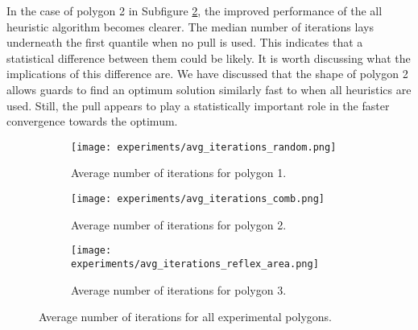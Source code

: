 In the case of polygon 2 in Subfigure \ref{fig:avg_iterations_comb}, the improved performance of the all heuristic algorithm becomes clearer. The median number of iterations lays underneath the first quantile when no pull is used. This indicates that a statistical difference between them could be likely. It is worth discussing what the implications of this difference are. We have discussed that the shape of polygon 2 allows guards to find an optimum solution similarly fast to when all heuristics are used. Still, the pull appears to play a statistically important role in the faster convergence towards the optimum. 

\begin{figure}[h!]
    \centering
    \begin{subfigure}{0.45\textwidth}
        \texttt{[image: experiments/avg\_iterations\_random.png]}
        \caption{Average number of iterations for polygon 1.}
        \label{fig:avg_iterations_random}
    \end{subfigure}
    \hfill
    \begin{subfigure}{0.45\textwidth}
        \texttt{[image: experiments/avg\_iterations\_comb.png]}
        \caption{Average number of iterations for polygon 2.}
        \label{fig:avg_iterations_comb}
    \end{subfigure}
    \begin{subfigure}{0.5\textwidth}
        \texttt{[image: experiments/avg\_iterations\_reflex\_area.png]}
        \caption{Average number of iterations for polygon 3.}
        \label{fig:avg_iterations_reflex_area}
    \end{subfigure}
    \caption{Average number of iterations for all experimental polygons.}
    \label{fig:avg_iterations}
\end{figure}


